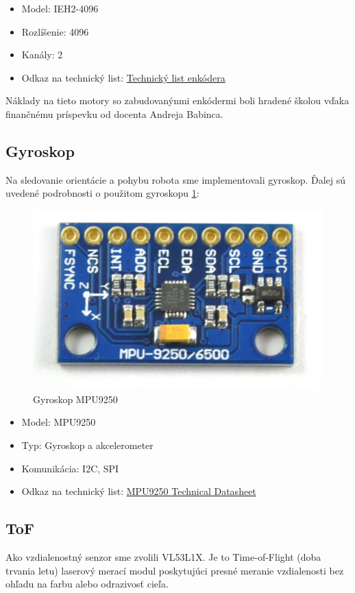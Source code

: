 \begin{itemize}
  \item Model: IEH2-4096
  \item Rozlíšenie: 4096
  \item Kanály: 2
  \item Odkaz na technický list: \href{https://www.faulhaber.com/fileadmin/Import/Media/EN_IEH2-4096_DFF.pdf}{Technický list enkódera}
\end{itemize}
Náklady na tieto motory so zabudovanýnmi enkódermi boli hradené školou vďaka finančnému príspevku od docenta Andreja Babinca.

\subsection{Gyroskop}

Na sledovanie orientácie a pohybu robota sme implementovali gyroskop. Ďalej sú uvedené podrobnosti o použitom gyroskopu \ref{fig:gyro}:
\begin{figure}[!htbp]
        \centering
        \includegraphics[scale=0.8]{includes/images/mpu9205.png}
        \caption{Gyroskop MPU9250}
        \label{fig:gyro}
\end{figure}
\begin{itemize}
  \item Model: MPU9250
  \item Typ: Gyroskop a akcelerometer
  \item Komunikácia: I2C, SPI
  \item Odkaz na technický list: \href{https://www.invensense.com/products/motion-tracking/9-axis/mpu-9250/}{MPU9250 Technical Datasheet}
\end{itemize}
\subsection{ToF}
Ako vzdialenostný senzor sme zvolili VL53L1X. Je to Time-of-Flight (doba trvania letu) laserový merací modul poskytujúci presné meranie vzdialenosti bez ohľadu na farbu alebo odrazivosť cieľa.

